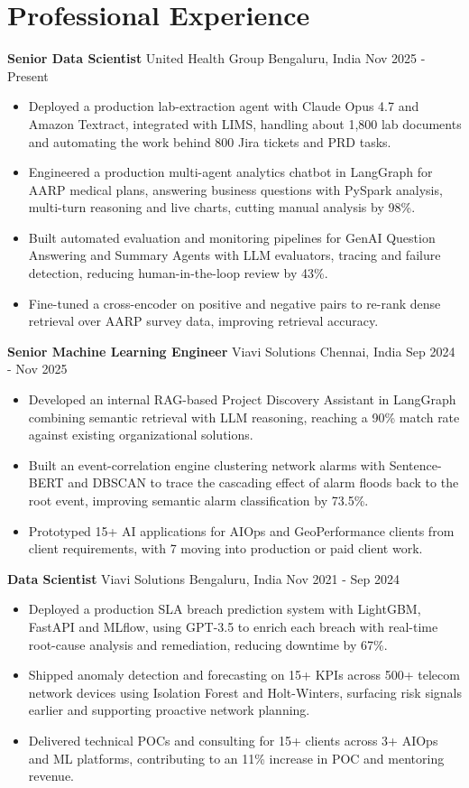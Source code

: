 \documentclass[10pt,a4paper]{article}
\newcommand{\role}[4]{\textbf{#1} \textbar{} #2 \hfill #3 \textbar{} #4\par}
\begin{document}
\section{Professional Experience}
\role{Senior Data Scientist}{United Health Group}{Bengaluru, India}{Nov 2025 - Present}
\begin{itemize}
  \item Deployed a production lab-extraction agent with Claude Opus 4.7 and Amazon Textract, integrated with LIMS, handling about 1,800 lab documents and automating the work behind 800 Jira tickets and PRD tasks.
  \item Engineered a production multi-agent analytics chatbot in LangGraph for AARP medical plans, answering business questions with PySpark analysis, multi-turn reasoning and live charts, cutting manual analysis by 98\%.
  \item Built automated evaluation and monitoring pipelines for GenAI Question Answering and Summary Agents with LLM evaluators, tracing and failure detection, reducing human-in-the-loop review by 43\%.
  \item Fine-tuned a cross-encoder on positive and negative pairs to re-rank dense retrieval over AARP survey data, improving retrieval accuracy.
\end{itemize}
\vspace{3pt}
\role{Senior Machine Learning Engineer}{Viavi Solutions}{Chennai, India}{Sep 2024 - Nov 2025}
\begin{itemize}
  \item Developed an internal RAG-based Project Discovery Assistant in LangGraph combining semantic retrieval with LLM reasoning, reaching a 90\% match rate against existing organizational solutions.
  \item Built an event-correlation engine clustering network alarms with Sentence-BERT and DBSCAN to trace the cascading effect of alarm floods back to the root event, improving semantic alarm classification by 73.5\%.
  \item Prototyped 15+ AI applications for AIOps and GeoPerformance clients from client requirements, with 7 moving into production or paid client work.
\end{itemize}
\vspace{3pt}
\role{Data Scientist}{Viavi Solutions}{Bengaluru, India}{Nov 2021 - Sep 2024}
\begin{itemize}
  \item Deployed a production SLA breach prediction system with LightGBM, FastAPI and MLflow, using GPT-3.5 to enrich each breach with real-time root-cause analysis and remediation, reducing downtime by 67\%.
  \item Shipped anomaly detection and forecasting on 15+ KPIs across 500+ telecom network devices using Isolation Forest and Holt-Winters, surfacing risk signals earlier and supporting proactive network planning.
  \item Delivered technical POCs and consulting for 15+ clients across 3+ AIOps and ML platforms, contributing to an 11\% increase in POC and mentoring revenue.
\end{itemize}
\end{document}
